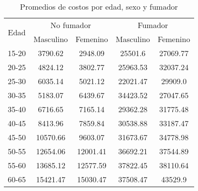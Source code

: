 \begin{table}[htb]
	\label{tab:costos} 
	\caption{Promedios de costos por edad, sexo y fumador} 
	\centering
	\begin{tabular}{ |c|c|c|c|c| } 
		\hline
		\multirow{2}{*}{Edad} & \multicolumn{2}{c|}{No fumador} & \multicolumn{2}{c|}{Fumador} \\ 
		\cline{2-5} 
& Masculino & Femenino & Masculino & Femenino \\ 
		\hline
		15-20 & 3790.62 & 2948.09 & 25501.6 & 27069.77 \\ 
		20-25 & 4824.12 & 3802.77 & 25963.53 & 32037.24 \\ 
		25-30 & 6035.14 & 5021.12 & 22021.47 & 29909.0 \\ 
		30-35 & 5183.07 & 6439.67 & 34423.52 & 27047.65 \\ 
		35-40 & 6716.65 & 7165.14 & 29362.28 & 31775.48 \\ 
		40-45 & 8413.96 & 7859.84 & 30538.88 & 33187.47 \\ 
		45-50 & 10570.66 & 9603.07 & 31673.67 & 34778.98 \\ 
		50-55 & 12654.06 & 12001.41 & 36692.21 & 37544.89 \\ 
		55-60 & 13685.12 & 12577.59 & 37822.45 & 38110.64 \\ 
		60-65 & 15421.47 & 15030.47 & 37508.47 & 43529.9 \\ 
		\hline 
	\end{tabular} 
\end{table} 
